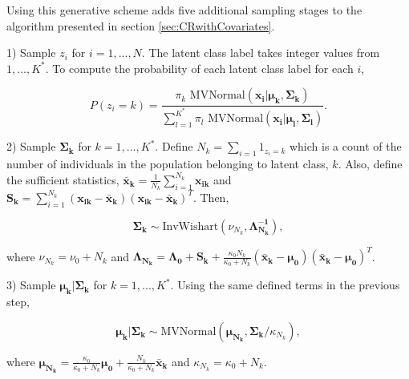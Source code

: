 \documentclass[
  12pt,
]{article}
\begin{document}
Using this generative scheme adds five additional sampling stages to the
algorithm presented in section \ref{sec:CRwithCovariates}.

\begin{list}{}{}

\item[1)] Sample $z_i$ for $i=1,...,N$. The latent class label takes integer values from $1,...,K^*$.  To compute the probability of each latent class label for each $i$,

\begin{equation}
P(z_i=k) = \frac{\pi_k \text{ MVNormal}(\boldsymbol{x_i}|\boldsymbol{\mu_k},\boldsymbol{\Sigma_k})}{\sum_{l=1}^{K^*}\pi_l \text{ MVNormal}(\boldsymbol{x_i}|\boldsymbol{\mu_l},\boldsymbol{\Sigma_l})}.
\end{equation}

\item[2)] Sample $\boldsymbol{\Sigma_k}$ for $k=1,...,K^*$. Define $N_k=\sum_{i=1}1_{z_i=k}$ which is a count of the number of individuals in the population belonging to latent class, $k$.  Also, define the sufficient statistics, $\boldsymbol{\bar{x}_k}=\frac{1}{N_k}\sum_{i=1}^{N_k}\boldsymbol{x_{ik}}$ and $\boldsymbol{S_k} = \sum_{i=1}^{N_k}(\boldsymbol{x_{ik}}-\boldsymbol{\bar{x}_k})(\boldsymbol{x_{ik}}-\boldsymbol{\bar{x}_k})^T$.  Then,

\begin{equation}
\boldsymbol{\Sigma_k} \sim \text{InvWishart}(\nu_{N_k},\boldsymbol{\Lambda_{N_k}^{-1}}),
\end{equation}

where $\nu_{N_k} = \nu_{0}+N_k$ and $\boldsymbol{\Lambda_{N_k}}=\boldsymbol{\Lambda_{0}}+\boldsymbol{S_k}+\frac{\kappa_{0}N_k}{\kappa_{0}+N_k}(\boldsymbol{\bar{x}_k}-\boldsymbol{\mu_{0}})(\boldsymbol{\bar{x}_k}-\boldsymbol{\mu_{0}})^T$.

\item[3)] Sample $\boldsymbol{\mu_k|\Sigma_k}$ for $k=1,...,K^*$.  Using the same defined terms in the previous step,

\begin{equation}
\boldsymbol{\mu_k}|\boldsymbol{\Sigma_k} \sim \text{MVNormal}(\boldsymbol{\mu_{N_k}},\boldsymbol{\Sigma_k}/\kappa_{N_k} ),
\end{equation}

where $\boldsymbol{\mu_{N_k}}=\frac{\kappa_{0}}{\kappa_{0}+N_k}\boldsymbol{\mu_{0}} + \frac{N_k}{\kappa_{0}+N_k}\boldsymbol{\bar{x}_k} $ and $\kappa_{N_k}=\kappa_{0}+N_k$.


\end{list}
\end{document}
